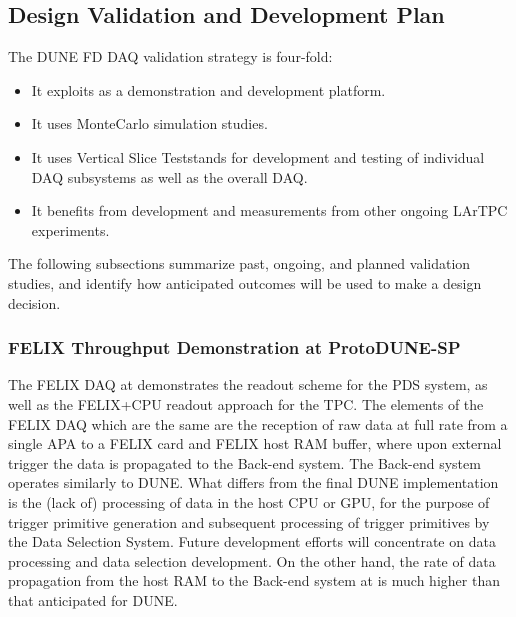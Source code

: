 \subsection{Design Validation and Development Plan}
\label{sec:sp-daq:design-validation}

The DUNE FD DAQ validation strategy is four-fold: 
\begin{itemize}
\item It exploits  as a
demonstration and development platform. 
\item It uses  MonteCarlo simulation studies.
\item It uses Vertical Slice Teststands for development and testing of
  individual DAQ subsystems as well as the overall DAQ.
\item It benefits from development and measurements from other ongoing
  LArTPC experiments.
\end{itemize}

The following subsections summarize past, ongoing, and planned
validation studies, and identify how anticipated outcomes
will be used to make a design decision.

\subsubsection{FELIX Throughput Demonstration at ProtoDUNE-SP}
\label{sec:sp-daq:validation-pdune-felix}


The FELIX DAQ at  demonstrates the readout scheme for
the PDS system, as well as the FELIX+CPU readout approach for the
TPC. The elements of the  FELIX DAQ which are the
same are the reception of raw data at full rate from a single APA to a
FELIX card and FELIX host RAM buffer, where upon external trigger the
data is propagated to the Back-end system. The Back-end system
operates similarly to DUNE. What differs from the final DUNE
implementation is the (lack of) processing of data in the host CPU or GPU, for
the purpose of trigger primitive generation and subsequent processing
of trigger primitives by the Data Selection System. Future development
efforts will concentrate on data processing and data selection
development. On the other hand, the rate of data propagation from the
host RAM to the Back-end system at  is much higher
than that anticipated for DUNE.

